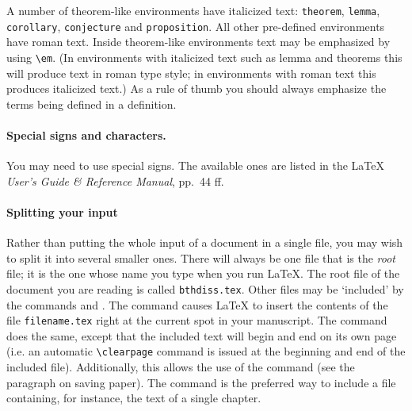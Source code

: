 A number of theorem-like environments have italicized text: \verb|theorem|, \verb|lemma|, \verb|corollary|, \verb|conjecture| and \verb|proposition|.
All other pre-defined environments have roman text.
Inside theorem-like environments text may be emphasized by using \verb|\em|. (In environments with italicized text such as lemma and theorems this will produce text in roman type style; in environments with roman text this produces italicized text.)
As a rule of thumb you should always emphasize the terms being defined in a definition.

\paragraph*{Special signs and characters.}
You may need to use special signs. The available ones are listed
in the \LaTeX{} {\em User's Guide \& Reference Manual\/}, pp.~44 ff.

\paragraph*{Splitting your input}
Rather than putting the whole input of a document in a single file, you may wish to split it into several smaller ones.
There will always be one file that is the {\em root} file; it is the one whose name you type when you run \LaTeX{}.
The root file of the document you are reading is called \verb|bthdiss.tex|.
Other files may be `included' by the commands \verb|| and \verb||.
The command \verb|| causes \LaTeX{} to insert the contents of the file \verb|filename.tex| right at the current spot in your manuscript.
The command \verb|| does the same, except that the included text will begin and end on its own page (i.e. an automatic \verb|\clearpage| command is issued at the beginning and end of the included file).
Additionally, this allows the use of the \verb|| command (see the paragraph on saving paper).
The \verb|| command is the preferred way to include a file containing, for instance, the text of a single chapter.

